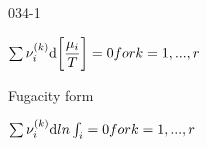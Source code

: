 \begin{mitframe}{034-1}
\begin{listone}
\begin{listtwo}
      	\begin{listthree}
            
            \item $\sum\nolimits\chargeval^{(k)}\mathrm{d}\bigg[\dfrac{\chempot_{i}}{\Temp}\bigg]=0	    for     k=1,...,r$
     
     
            
		\end{listthree}
       
        \item Fugacity form

      	\begin{listthree}
            
            \item $\sum\nolimits\chargeval^{(k)}\mathrm{d}ln\int_{i}=0     for     k=1,...,r$
     
     

		\end{listthree}
    
    \end{listtwo}               
    
\end{listone}

\end{mitframe}